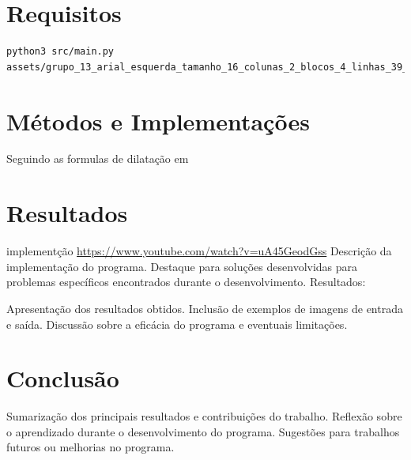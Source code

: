 \documentclass[english, 
               brazil, 
               bsc] %
               {dcomp-abntex2}
\begin{document}
\chapter{Requisitos}

\begin{verbatim}
python3 src/main.py assets/grupo_13_arial_esquerda_tamanho_16_colunas_2_blocos_4_linhas_39_palavras_318.pbm
\end{verbatim}



\chapter{Métodos e Implementações}


Seguindo as formulas de dilatação em \cite[capitulo 9]{gonzalez2008digital}

\chapter{Resultados}

implementção \url{https://www.youtube.com/watch?v=uA45GeodGss}
Descrição da implementação do programa.
Destaque para soluções desenvolvidas para problemas específicos encontrados durante o desenvolvimento.
Resultados:

Apresentação dos resultados obtidos.
Inclusão de exemplos de imagens de entrada e saída.
Discussão sobre a eficácia do programa e eventuais limitações.


\chapter{Conclusão}

Sumarização dos principais resultados e contribuições do trabalho.
Reflexão sobre o aprendizado durante o desenvolvimento do programa.
Sugestões para trabalhos futuros ou melhorias no programa.









\postextual


\renewcommand{\chapnumfont}{\chaptitlefont}
\renewcommand{\afterchapternum}{}
% 
% 
\end{document}
